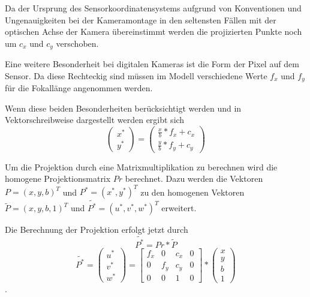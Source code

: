 Da der Ursprung des Sensorkoordinatensystems aufgrund von Konventionen und Ungenauigkeiten
bei der Kameramontage in den seltensten Fällen mit der optischen Achse der Kamera
übereinstimmt werden die projizierten Punkte noch um $c_x$ und $c_y$ verschoben.

Eine weitere Besonderheit bei digitalen Kameras ist die Form der Pixel auf dem 
Sensor. Da diese Rechteckig sind müssen im Modell verschiedene Werte $f_x$ und $f_y$ für die 
Fokallänge angenommen werden. 

Wenn diese beiden Besonderheiten berücksichtigt werden und in Vektorschreibweise dargestellt 
werden ergibt sich
\begin{equation}
  \begin{pmatrix}
    x^*\\y^*
  \end{pmatrix}
  =
  \begin{pmatrix}
    \frac{x}{b}*f_x+c_x \\
    \frac{y}{b}*f_y+c_y 
  \end{pmatrix}
 \end{equation}

Um die Projektion durch eine Matrixmultiplikation zu berechnen wird die homogene 
Projektionsmatrix $Pr$ berechnet. Dazu werden die Vektoren $P=\left(x,y,b\right)^T$ und $P^*=\left(x^*,y^*\right)^T$ zu den 
homogenen Vektoren $\tilde{P}=\left(x,y,b,1\right)^T$ und $\tilde{P^*}=\left(u^*,v^*,w^*\right)^T$ 
erweitert.

Die Berechnung der Projektion erfolgt jetzt durch
\begin{equation}
  \tilde{P^*}=Pr*\tilde{P}
\end{equation}
\begin{equation}
  \tilde{P^*}=
  \begin{pmatrix}
  u^*\\v^*\\w^*
  \end{pmatrix}
  =
  \begin{bmatrix}
    f_x&0&c_x&0\\
    0&f_y&c_y&0\\
    0&0&1&0
  \end{bmatrix}
  *
  \begin{pmatrix}
    x\\y\\b\\1
  \end{pmatrix}
\end{equation}.




